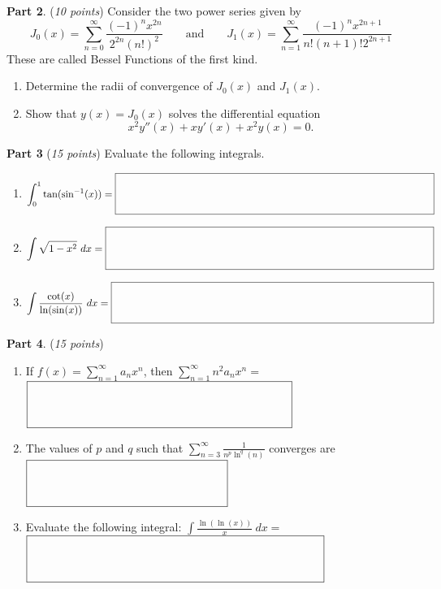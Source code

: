 \documentclass[12pt]{article}
\begin{document}
\newpage

\textbf{Part 2}. (\textit{10 points}) Consider the two power series given by 
\[
    J_{0}(x)=\sum_{n=0}^{\infty}\frac{(-1)^{n}x^{2n}}{2^{2n}(n!)^{2}} \quad \quad \text{and}\quad \quad  J_{1}(x)=\sum_{n=1}^{\infty}\frac{(-1)^{n}x^{2n+1}}{n!(n+1)!2^{2n+1}}
\]
These are called Bessel Functions of the first kind. 
\begin{enumerate}[label=\textbf{Q\arabic*}]
    \item Determine the radii of convergence of $J_{0}(x)$ and $J_{1}(x)$. 
    \vspace{11cm} 
    \item Show that $y(x)=J_{0}(x)$ solves the differential equation 
    \[
        x^{2}y''(x)+xy'(x)+x^{2}y(x)=0. 
    \]
\end{enumerate}


\newpage

\textbf{Part 3} (\textit{15 points}) Evaluate the following integrals.
\begin{enumerate}[label=\textbf{Q\arabic*}]
    \item  $\displaystyle \int_{0}^{1} \tan(\sin^{-1}(x))=\fbox{\raisebox{-0.4\height}{\makebox[11cm]{\rule{0pt}{8ex}}}}$ 
    \vspace{6cm} 
    \item $\displaystyle\int\sqrt{1-x^{2}} \ dx=\fbox{\raisebox{-0.4\height}{\makebox[11cm]{\rule{0pt}{8ex}}}}$
    \vspace{6cm}
    \item $\displaystyle \int\frac{\cot(x)}{\ln(\sin(x))} \ dx= \fbox{\raisebox{-0.4\height}{\makebox[11cm]{\rule{0pt}{8ex}}}}$
\end{enumerate}

\newpage

\textbf{Part 4}. (\textit{15 points})
\begin{enumerate}[label=\textbf{Q\arabic*}]
    \item If $\displaystyle f(x)=\sum_{n=1}^{\infty}a_{n}x^{n}$, then $\displaystyle\sum_{n=1}^{\infty}n^{2}a_{n}x^{n}=$ $\fbox{\raisebox{-0.4\height}{\makebox[8cm]{\rule{0pt}{8ex}}}}$
    \vspace{1.80in}
    \item The values of $p$ and $q$ such that  $\displaystyle\sum_{n=3}^{\infty}\frac{1}{n^{p}\ln^{q}(n)}$ converges are $\fbox{\raisebox{-0.4\height}{\makebox[6cm]{\rule{0pt}{8ex}}}}$
    \vspace{1.8in}
    \item  Evaluate the following integral: $\displaystyle\int\frac{\ln(\ln(x))}{x}\ dx=$  $\fbox{\raisebox{-0.4\height}{\makebox[9cm]{\rule{0pt}{8ex}}}}$
\end{enumerate}
\end{document}
